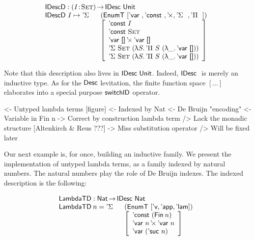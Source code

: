 \[\stk{
\IDescD : \PI{\V{I}}{\Set} \IDesc{\Unit} \\
\begin{array}{@{}ll}
\IDescD~I \mapsto \DSigma{}{} & (\EnumT [ \DVar{},
                                          \DConst{},
                                          \DProd{}{},
                                          \DSigma{}{}, 
                                          \DPi{}{} ]) \\
                              & \left[\begin{array}{l}
                                      \DConst{I}                  \\
                                      \DConst{\Set}               \\
                                      \DProd{\DVar{\Void}}{\DVar{\Void}}  \\
                                      \DSigma{\Set}{(\LAM{S} \DPi{S}{(\LAM{\_} \DVar{\Void})})} \\
                                      \DSigma{\Set}{(\LAM{S} \DPi{S}{(\LAM{\_} \DVar{\Void})})}
                                   \end{array}
                             \right]
\end{array}
}\]

Note that this description also lives in $\IDesc{\Unit}$. Indeed,
$\IDesc$ is merely an inductive type. As for the $\Desc$ levitation,
the finite function space $[ \ldots ]$ elaborates into a special
purpose $\F{switchID}$ operator. 

\begin{wstructure}
<- Untyped lambda terms [figure]
    <- Indexed by Nat
        <- De Bruijn "encoding"
    <- Variable in Fin n
        -> Correct by construction lambda term
    /> Lack the monadic structure [Altenkirch & Reus ???]
        -> Miss substitution operator
        /> Will be fixed later
\end{wstructure}

Our next example is, for once, building an inductive family. We
present the implementation of untyped lambda terms, as a family
indexed by natural numbers. The natural numbers play the role of De
Bruijn indexes. The indexed description is the following:

\[\stk{
\LambdaTD : \Nat \To \IDesc{\Nat} \\
\begin{array}{@{}ll}
\LambdaTD\: n = \DSigma{}{} & (\EnumT [ \LambdaTVar, \LambdaTApp, \LambdaTLam ]) \\
                            & \left[\begin{array}{l}
                                  \DConst{(\Fin{n})} \\
                                  \DProd{\DVar{n}}{\DVar{n}} \\
                                  \DVar{(\NatSuc{n})}
                              \end{array}\right]
\end{array}
}\]

